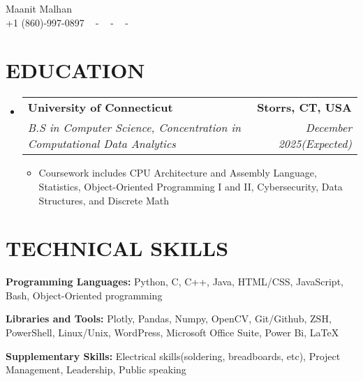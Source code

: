 \documentclass[letterpaper,11pt]{article}
\makeatletter
\newcommand{\resumeItem}[1]{
  \item\small{
    {#1 \vspace{-1pt}}
  }
}
\newcommand{\resumeSubheading}[4]{
  \vspace{-2pt}\item
    \begin{tabular*}{1.0\textwidth}[t]{l@{\extracolsep{\fill}}r}
      \textbf{\large#1} & \textbf{\small #2} \\
      \textit{\large#3} & \textit{\small #4} \\
      
    \end{tabular*}\vspace{-7pt}
}
\newcommand{\resumeSubHeadingListStart}{\begin{itemize}[leftmargin=0.0in, label={}]}
\newcommand{\resumeSubHeadingListEnd}{\end{itemize}}
\newcommand{\resumeItemListStart}{\begin{itemize}[leftmargin=0.1in]}
\newcommand{\resumeItemListEnd}{\end{itemize}\vspace{-5pt}}
\makeatother
\begin{document}


\begin{center}
    {\huge Maanit Malhan} \\ \vspace{2pt} 
    {+1 (860)-997-0897} ~ 
    \small{-}
    \href{mailto:[maanitmalhan@gmail.com]}{\color{blue}{maanitmalhan@gmail.com}} ~ 
    \small{-}
    \href{[https://www.linkedin.com/in/maanit-malhan/]}{ \color{blue}{https://www.linkedin.com/in/maanit-malhan}}  ~
    \small{-}
    \href{[Maanit Malhan]}{ \color{blue}{https://github.com/maanitmalhan}} ~
    \vspace{-7pt}
\end{center}

\section{\color{airforceblue}EDUCATION}
  \resumeSubHeadingListStart
    \resumeSubheading
      {University of Connecticut}{Storrs, CT, USA}
      {B.S in Computer Science, Concentration in Computational Data Analytics}{December 2025(Expected)}
       \resumeItemListStart
            \resumeItem{\normalsize{Coursework includes CPU Architecture and Assembly Language, Statistics, Object-Oriented Programming I and II, Cybersecurity, Data Structures, and Discrete Math}}
            
      \resumeItemListEnd  
    \vspace{-4pt}
     
  \resumeSubHeadingListEnd
  \vspace{-10pt}

\section{\color{airforceblue}TECHNICAL SKILLS}
 \begin{itemize}[leftmargin=0in, label={}]
    \small{\item{
     \textbf{\normalsize{Programming Languages:}}{ \normalsize{Python, C, C++, Java, HTML/CSS, JavaScript, Bash, Object-Oriented programming}} \\
      \vspace{1.2pt}
      
     \textbf{\normalsize{Libraries and Tools:}}{ \normalsize{Plotly, Pandas, Numpy, OpenCV, Git/Github, ZSH, PowerShell, Linux/Unix, WordPress, Microsoft Office Suite, Power Bi, LaTeX}} \\
      \vspace{1.2pt}
      
     \textbf{\normalsize{Supplementary Skills:}}{ \normalsize{Electrical skills(soldering, breadboards, etc), Project Management, Leadership, Public speaking}}

     }}
 \end{itemize}
 \vspace{-16pt}
 
\end{document}
